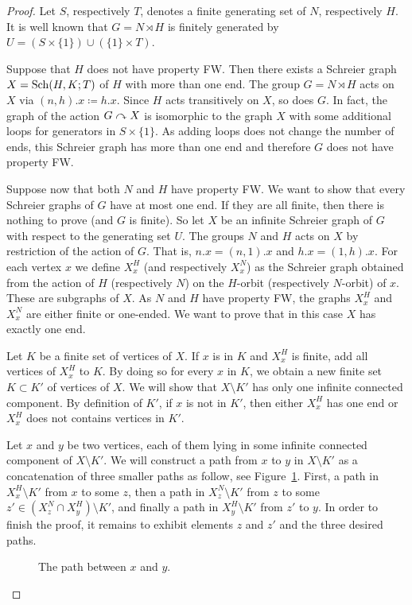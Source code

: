 %
\begin{proof}
Let $S$, respectively $T$, denotes a finite generating set of $N$, respectively $H$.
It is well known that $G=N\rtimes H$ is finitely generated by $U=(S\times\{1\}) \cup(\{1\}\times T)$.

Suppose that $H$ does not have property FW. Then there exists a Schreier graph $X=\operatorname{Sch}(H,K;T)$ of $H$ with more than one end. The group $G=N\rtimes H$ acts on $X$ via $(n,h).x \coloneqq h.x$.
Since $H$ acts transitively on $X$, so does $G$.
In fact, the graph of the action $G \curvearrowright X$ is isomorphic to the graph $X$ with some additional loops for generators in $S\times\{1\}$. As adding loops does not change the number of ends, this Schreier graph has more than one end and therefore $G$ does not have property FW.

Suppose now that both $N$ and $H$ have property FW. We want to show that every Schreier graphs of $G$ have at most one end. If they are all finite, then there is nothing to prove (and $G$ is finite). So let $X$ be an infinite Schreier graph of $G$ with respect to the generating set $U$. The groups $N$ and $H$ acts on $X$ by restriction of the action of $G$. That is, $n.x = (n,1).x$ and $h.x = (1,h).x$.
For each vertex $x$ we define $X_x^H$ (and respectively $X_x^N$) as the Schreier graph obtained from the action of $H$ (respectively $N$) on the $H$-orbit (respectively $N$-orbit) of $x$. These are subgraphs of $X$. As $N$ and $H$ have property FW, the graphs $X_x^H$ and $X_x^N$ are either finite or one-ended. We want to prove that in this case $X$ has exactly one end. 

Let $K$ be a finite set of vertices of $X$.
If $x$ is in $K$ and $X_x^H$ is finite, add all vertices of $X_x^H$ to $K$.
By doing so for every $x$ in $K$, we obtain a new finite set $K\subset K'$ of vertices of $X$.
We will show that $X\setminus K'$ has only one infinite connected component.
By definition of $K'$, if $x$ is not in $K'$, then either $X_x^H$ has one end or $X_x^H$ does not contains vertices in $K'$. 

Let $x$ and $y$ be two vertices, each of them lying in some infinite connected component of $X\setminus K'$.
We will construct a path from $x$ to $y$ in $X\setminus K'$ as a concatenation of three smaller paths as follow, see Figure~\ref{Figure:PathSemiDirect}.
First, a path in $X_x^H\setminus K'$ from $x$ to some $z$, then a path in $X_z^N\setminus K'$ from $z$ to some $z'\in (X_z^N\cap X_y^H)\setminus K'$, and finally a path in $X_y^H\setminus K'$ from $z'$ to $y$.
In order to finish the proof, it remains to exhibit elements $z$ and $z'$ and the three desired paths.
\begin{figure}[H]\centering
\scalebox{0.7}{
}
\caption{The path between $x$ and $y$.}
\label{Figure:PathSemiDirect}
\end{figure}


\end{proof}
